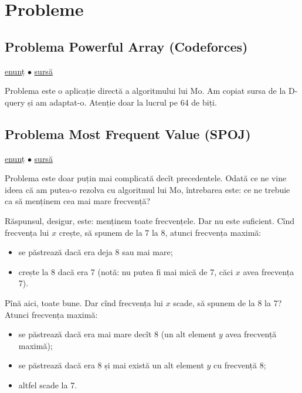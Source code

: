 \documentclass[../main.tex]{subfiles}
\begin{document}
\section{Probleme}

\subsection{Problema Powerful Array (Codeforces)}
\label{problem:powerful-array}

\href{https://codeforces.com/contest/86/problem/D}{enunț}
$\bullet$
\hyperref[code:powerful-array]{sursă}

Problema este o aplicație directă a algoritmului lui Mo. Am copiat sursa de la D-query și am adaptat-o. Atenție doar la lucrul pe 64 de biți.

\subsection{Problema Most Frequent Value (SPOJ)}
\label{problem:most-frequent-value}

\href{https://www.spoj.com/problems/FREQ2/}{enunț}
$\bullet$
\hyperref[code:most-frequent-value]{sursă}

Problema este doar puțin mai complicată decît precedentele. Odată ce ne vine ideea că am putea-o rezolva cu algoritmul lui Mo, întrebarea este: ce ne trebuie ca să menținem cea mai mare frecvență?

Răspunsul, desigur, este: menținem toate frecvențele. Dar nu este suficient. Cînd frecvența lui $x$ crește, să spunem de la 7 la 8, atunci frecvența maximă:

\begin{itemize}
  \item se păstrează dacă era deja 8 sau mai mare;
  \item crește la 8 dacă era 7 (notă: nu putea fi mai mică de 7, căci $x$ avea frecvența 7).
\end{itemize}

Pînă aici, toate bune. Dar cînd frecvența lui $x$ scade, să spunem de la 8 la 7? Atunci frecvența maximă:

\begin{itemize}
  \item se păstrează dacă era mai mare decît 8 (un alt element $y$ avea frecvență maximă);
  \item se păstrează dacă era 8 și mai există un alt element $y$ cu frecvență 8;
  \item altfel scade la 7.
\end{itemize}
\end{document}
